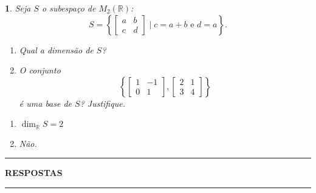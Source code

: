 \documentclass[12pt]{exam}
\newtheorem{exercicio}{}
\newcommand{\real}{\mathbb{R}}
\begin{document}
\begin{exercicio}
  Seja $S$ o subespa\c{c}o de $M_2(\real)$:
  \[
    S = \left\{\begin{bmatrix}
      a & b\\c & d
    \end{bmatrix} \mid c = a+b \mbox{ e } d = a\right\}.
  \]
  \begin{enumerate}[label={\alph*})]
    \item Qual a dimens\~ao de $S$?
    \item O conjunto
    \[
      \left\{\begin{bmatrix}
        1 & -1\\0 & 1
      \end{bmatrix}, \begin{bmatrix}
        2 & 1\\3 & 4
      \end{bmatrix}\right\}
    \]
    \'e uma base de $S$? Justifique.
  \end{enumerate}
  \begin{solucao}
    \begin{enumerate}[label={\alph*})]
      \item $\dim_\real S = 2$
      \item N\~ao.
    \end{enumerate}
  \end{solucao}
\end{exercicio}

\newpage
{}
\hrule
\begin{center}
{\large\bf RESPOSTAS}
\end{center}
\hrule

\end{document}
